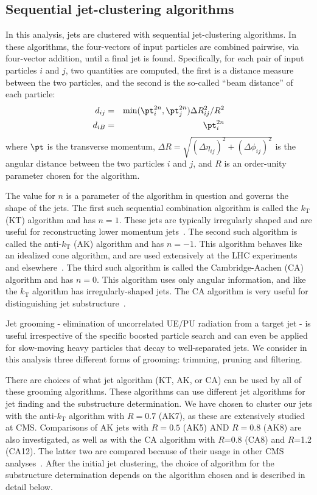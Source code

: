 \subsection{Sequential jet-clustering algorithms}
\label{sec:algos}

In this analysis, jets are clustered with sequential jet-clustering algorithms. 
In these algorithms, the four-vectors of input particles are combined pairwise, 
via four-vector addition, until a final jet
is found. Specifically, for each pair of input particles $i$ and $j$,
two quantities are computed, the first is a distance measure between
the two particles, and the second is the so-called ``beam distance''
of each particle:
\begin{eqnarray}
\label{eq:dij}
d_{ij} &=& \mathrm{min}({\pt}_i^{2n},{\pt}_j^{2n}) \Delta R_{ij}^2 / R^2 \\
d_{iB} &=& {\pt}_i^{2n}
\end{eqnarray}
where $\pt$ is the transverse momentum, 
$\Delta R = \sqrt{(\Delta \eta_{ij})^2 + (\Delta\phi_{ij})^2 }$
is the angular distance between the two particles $i$ and $j$,
and $R$ is an order-unity parameter chosen for the algorithm.

The value for $n$ is a parameter of the algorithm in question and
governs the shape of the jets.
The first such sequential combination algorithm is called the
$k_{\mathrm{T}}$ (KT) algorithm and has $n=1$. These jets are typically irregularly
shaped and are useful for reconstructing lower momentum jets~\cite{ktalg}. 
The second such algorithm
is called the anti-$k_{\mathrm{T}}$ (AK) algorithm and has $n=-1$. This algorithm
behaves like an idealized cone algorithm, and are used extensively
at the LHC experiments and elsewhere~\cite{ktalg}. The third such
algorithm is called the Cambridge-Aachen (CA) algorithm and has $n=0$. This
algorithm uses only angular information, and like the $k_\mathrm{T}$ algorithm
has irregularly-shaped jets. The CA algorithm is very useful for distinguishing
jet substructure~\cite{CAcambridge,CAaachen}.

Jet grooming - elimination of uncorrelated UE/PU radiation from a target jet - is useful irrespective of the specific 
boosted particle search and can even be applied for slow-moving heavy particles that decay to well-separated jets. 
We consider in this analysis three different forms of grooming: trimming, pruning and filtering. 

There are choices of what jet algorithm (KT, AK, or CA) can be used by all of these grooming
algorithms. These algorithms can use different jet algorithms for jet finding and the
substructure determination. We have chosen to cluster our jets with the anti-$k_{\mathrm{T}}$
algorithm with $R=0.7$ (AK7), as these are extensively studied at CMS. 
Comparisons of AK jets with $R=0.5$ (AK5) AND $R=0.8$ (AK8)
are also investigated, 
as well as
with the CA algorithm with $R$=0.8 (CA8) and $R$=1.2 (CA12). The latter
two are compared because of their usage in other CMS analyses~\cite{EXO-11-006,HIG-11-XX}. 
After the initial jet clustering, the choice of algorithm
for the substructure determination depends on the algorithm chosen and is described
in detail below. 

